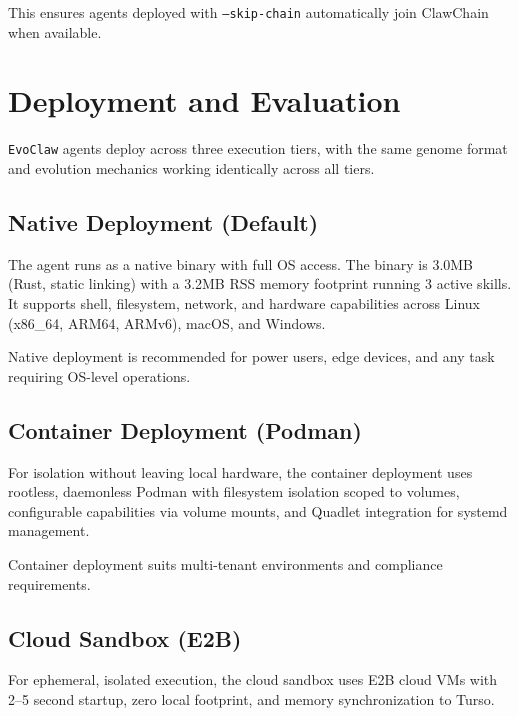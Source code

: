\documentclass[conference]{IEEEtran}
\newcommand{\evoclaw}{\texttt{EvoClaw}\xspace}
\begin{document}
This ensures agents deployed with \texttt{--skip-chain} automatically join ClawChain when available.



\section{Deployment and Evaluation}
\label{sec:deployment}

\evoclaw{} agents deploy across three execution tiers, with the same genome format and evolution mechanics working identically across all tiers.

\subsection{Native Deployment (Default)}

The agent runs as a native binary with full OS access. The binary is 3.0MB (Rust, static linking) with a 3.2MB RSS memory footprint running 3 active skills. It supports shell, filesystem, network, and hardware capabilities across Linux (x86\_64, ARM64, ARMv6), macOS, and Windows.

Native deployment is recommended for power users, edge devices, and any task requiring OS-level operations.

\subsection{Container Deployment (Podman)}

For isolation without leaving local hardware, the container deployment uses rootless, daemonless Podman with filesystem isolation scoped to volumes, configurable capabilities via volume mounts, and Quadlet integration for systemd management.

Container deployment suits multi-tenant environments and compliance requirements.

\subsection{Cloud Sandbox (E2B)}

For ephemeral, isolated execution, the cloud sandbox uses E2B cloud VMs with 2--5 second startup, zero local footprint, and memory synchronization to Turso.
\end{document}
